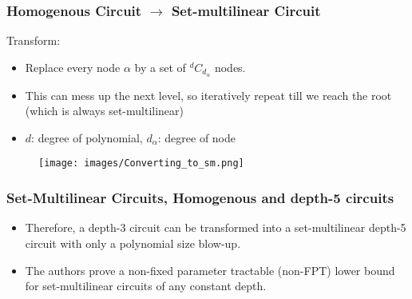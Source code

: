 \documentclass{beamer}
\begin{document}
\begin{frame}[allowframebreaks]
\frametitle{Homogenous Circuit $\rightarrow$ Set-multilinear Circuit}
Transform:
\vspace{0.6cm}
\begin{itemize}
\item  Replace every node $\alpha$ by a set of $^dC_{d_\alpha}$ nodes.
\vspace{0.6cm}
\item This can mess up the next level, so iteratively repeat till we reach the root (which is always set-multilinear)
\vspace{0.6cm}
\item $d$: degree of polynomial, $d_\alpha$: degree of node
\end{itemize}
\begin{figure}[H]
    \centering
    \texttt{[image: images/Converting\_to\_sm.png]}
\end{figure}

\end{frame}

\begin{frame}[allowframebreaks]
\frametitle{Set-Multilinear Circuits, Homogenous and depth-5 circuits}
\begin{itemize}
    \item Therefore, a depth-3 circuit can be transformed into a set-multilinear depth-5 circuit with only a polynomial size blow-up.
    \item The authors prove a non-fixed parameter tractable (non-FPT) lower bound for set-multilinear circuits of any constant depth. \\

\end{itemize}
\end{frame}
\end{document}
